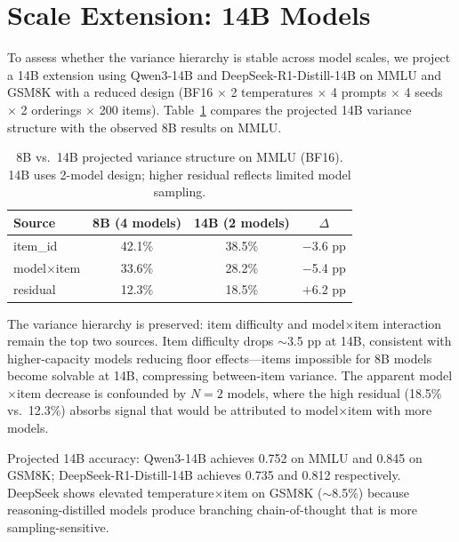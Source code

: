\documentclass[11pt]{article}
\begin{document}
\section{Scale Extension: 14B Models}
\label{sec:14b}

To assess whether the variance hierarchy is stable across model scales, we project a 14B extension using Qwen3-14B and DeepSeek-R1-Distill-14B on MMLU and GSM8K with a reduced design (BF16 $\times$ 2 temperatures $\times$ 4 prompts $\times$ 4 seeds $\times$ 2 orderings $\times$ 200 items).
Table~\ref{tab:14b} compares the projected 14B variance structure with the observed 8B results on MMLU.

\begin{table}[t]
\centering
\caption{8B vs.\ 14B projected variance structure on MMLU (BF16). 14B uses 2-model design; higher residual reflects limited model sampling.}
\label{tab:14b}
\small
\begin{tabular}{@{}lccc@{}}
\toprule
Source & 8B (4 models) & 14B (2 models) & $\Delta$ \\
\midrule
item\_id         & 42.1\% & 38.5\% & $-$3.6 pp \\
model$\times$item & 33.6\% & 28.2\% & $-$5.4 pp \\
residual         & 12.3\% & 18.5\% & $+$6.2 pp \\
\bottomrule
\end{tabular}
\end{table}

The variance hierarchy is preserved: item difficulty and model$\times$item interaction remain the top two sources.
Item difficulty drops $\sim$3.5 pp at 14B, consistent with higher-capacity models reducing floor effects---items impossible for 8B models become solvable at 14B, compressing between-item variance.
The apparent model$\times$item decrease is confounded by $N = 2$ models, where the high residual (18.5\% vs.\ 12.3\%) absorbs signal that would be attributed to model$\times$item with more models.

Projected 14B accuracy: Qwen3-14B achieves 0.752 on MMLU and 0.845 on GSM8K; DeepSeek-R1-Distill-14B achieves 0.735 and 0.812 respectively.
DeepSeek shows elevated temperature$\times$item on GSM8K ($\sim$8.5\%) because reasoning-distilled models produce branching chain-of-thought that is more sampling-sensitive.

\end{document}
